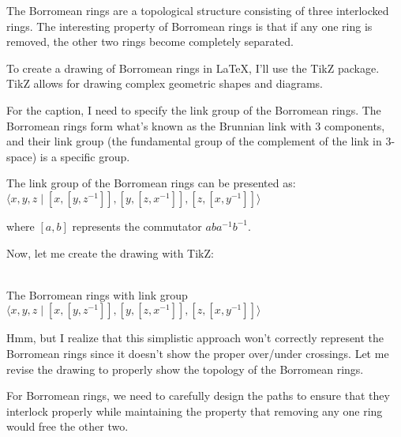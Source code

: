 \documentclass[12p]{article}
\newcounter{reasoningcounter}
\newenvironment{reasoning}[1][]
{\refstepcounter{reasoningcounter}%
\begin{tcolorbox}[
    title=Reasoning \thereasoningcounter: #1,
    colback=white, %
    colframe=gray,
    coltext=black, %
    fonttitle=\bfseries\normalsize,
    top=2mm,
    bottom=2mm,
    enlarge top initially by=5mm
]
\small
}
{\end{tcolorbox}}
\begin{document}
\begin{reasoning}[by anthropic/claude-3.7-sonnet:thinking (generated in 2 minutes and 48 seconds.)]
The Borromean rings are a topological structure consisting of three interlocked rings. The interesting property of Borromean rings is that if any one ring is removed, the other two rings become completely separated.

To create a drawing of Borromean rings in LaTeX, I'll use the TikZ package. TikZ allows for drawing complex geometric shapes and diagrams.

For the caption, I need to specify the link group of the Borromean rings. The Borromean rings form what's known as the Brunnian link with 3 components, and their link group (the fundamental group of the complement of the link in 3-space) is a specific group.

The link group of the Borromean rings can be presented as:
$\langle x, y, z \mid [x,[y,z^{-1}]], [y,[z,x^{-1}]], [z,[x,y^{-1}]] \rangle$

where $[a,b]$ represents the commutator $aba^{-1}b^{-1}$.

Now, let me create the drawing with TikZ:

\\
The Borromean rings with link group $\langle x, y, z \mid [x,[y,z^{-1}]], [y,[z,x^{-1}]], [z,[x,y^{-1}]] \rangle$

Hmm, but I realize that this simplistic approach won't correctly represent the Borromean rings since it doesn't show the proper over/under crossings. Let me revise the drawing to properly show the topology of the Borromean rings.

For Borromean rings, we need to carefully design the paths to ensure that they interlock properly while maintaining the property that removing any one ring would free the other two.


\end{reasoning}
\end{document}
